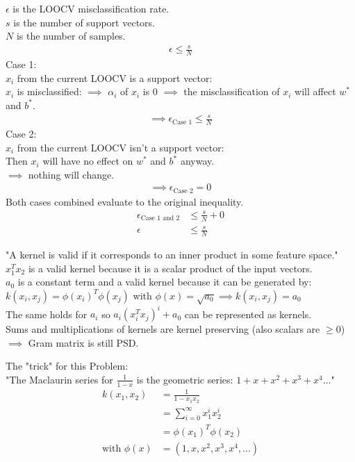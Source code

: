 \begin{flushleft}
$\epsilon$ is the LOOCV misclassification rate.\\
$s$ is the number of support vectors.\\
$N$ is the number of samples.
\begin{align*}
\epsilon \leq \frac{s}{N}
\end{align*}
Case 1: \\
$x_i$ from the current LOOCV is a support vector: \\
$x_i$ is misclassified: $\implies$ $\alpha_i$ of $x_i$ is $0$ $\implies$
the misclassification of $x_i$ will affect $w^*$ and $b^*$.
\begin{align*}
\implies \epsilon_{\text{Case 1}} \leq \frac{s}{N}
\end{align*}
Case 2: \\
$x_i$ from the current LOOCV isn't a support vector: \\
Then $x_i$ will have no effect on $w^*$ and $b^*$ anyway.\\
$\implies$ nothing will change.
\begin{align*}
\implies \epsilon_{\text{Case 2}} = 0
\end{align*}
Both cases combined evaluate to the original inequality.
\begin{align*}
\epsilon_{\text{Case 1 and 2}} &\leq \frac{s}{N} + 0\\
\epsilon &\leq \frac{s}{N}
\end{align*}
\end{flushleft}
%
%
%
%
%
%
\begin{flushleft}
"A kernel is valid if it corresponds to an inner product in some feature space."\\
$x_{1}^{T}x_{2}$ is a valid kernel because it is a scalar product of the input vectors.\\
$a_{0}$ is a constant term and a valid kernel because it can be generated by:\\
$k(x_i,x_j) = \phi(x_i)^T\phi(x_j)$ with $\phi(x) = \sqrt{a_0} \implies k(x_i,x_j) = a_0$\\
The same holds for $a_i$ so $a_i(x_i^T x_j)^i + a_0$ can be represented as kernels.\\
Sums and multiplications of kernels are kernel preserving (also scalars are $\geq 0$)\\
$\implies$ Gram matrix is still PSD.
\end{flushleft}
%
%
%
\begin{flushleft}
The "trick" for this Problem:\\
"The Maclaurin series for $\frac{1}{1-x}$ is the geometric series:
$1 + x + x^2 + x^3 + x^4 ...$"
\begin{align*}
k(x_1,x_2)&=\frac{1}{1-x_1 x_2}\\
&= \sum_{i=0}^{\infty}x_1^i x_2^i\\
&= \phi(x_1)^T \phi(x_2)\\
\text{with } \phi(x)&=(1,x,x^2,x^3,x^4, ...)
\end{align*}
\end{flushleft}

